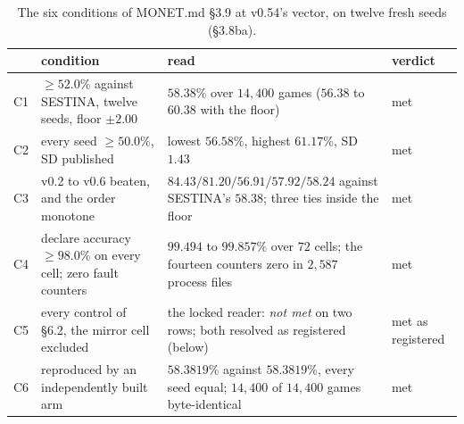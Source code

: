 \documentclass[11pt]{article}
\newcommand{\monet}{MONET.md}
\newcommand{\sect}[1]{\S#1}
\newcommand{\VCsixRead}{$58.3819\%$ against $58.3819\%$, every seed equal; $14{,}400$ of $14{,}400$ games byte-identical}
\newcommand{\VCsixVerdict}{met}
\begin{document}
\begin{table}[t]
\centering
\small
\caption{The six conditions of \monet{} \sect{3.9} at v0.54's vector, on twelve fresh seeds (\sect{3.8ba}).}
\label{tab:accept}
\begin{tabularx}{\linewidth}{@{}c>{\raggedright\arraybackslash}X>{\raggedright\arraybackslash}Xl@{}}
\toprule
 & condition & read & verdict \\
\midrule
C1 & $\ge 52.0\%$ against SESTINA, twelve seeds, floor $\pm 2.00$ & $58.38\%$ over $14{,}400$ games ($56.38$ to $60.38$ with the floor) & met \\
C2 & every seed $\ge 50.0\%$, SD published & lowest $56.58\%$, highest $61.17\%$, SD $1.43$ & met \\
C3 & v0.2 to v0.6 beaten, and the order monotone & $84.43 / 81.20 / 56.91 / 57.92 / 58.24$ against SESTINA's $58.38$; three ties inside the floor & met \\
C4 & declare accuracy $\ge 98.0\%$ on every cell; zero fault counters & $99.494$ to $99.857\%$ over $72$ cells; the fourteen counters zero in $2{,}587$ process files & met \\
C5 & every control of \sect{6.2}, the mirror cell excluded & the locked reader: \emph{not met} on two rows; both resolved as registered (below) & met as registered \\
C6 & reproduced by an independently built arm & \VCsixRead{} & \VCsixVerdict{} \\
\bottomrule
\end{tabularx}
\end{table}
\end{document}

